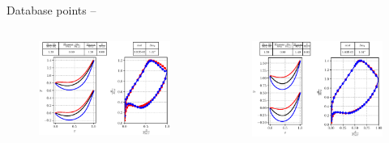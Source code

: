 \begin{frame}{Database points -- }
    \begin{columns}
        \begin{figure}
            \centering
            \includegraphics[scale=\scaleVal]{./images/bladeVal1962.eps}
        \end{figure}
        \begin{figure}
            \centering
            \includegraphics[scale=\scaleVal]{./images/bladeVal0477.eps}
        \end{figure}
    \end{columns}
\end{frame}

